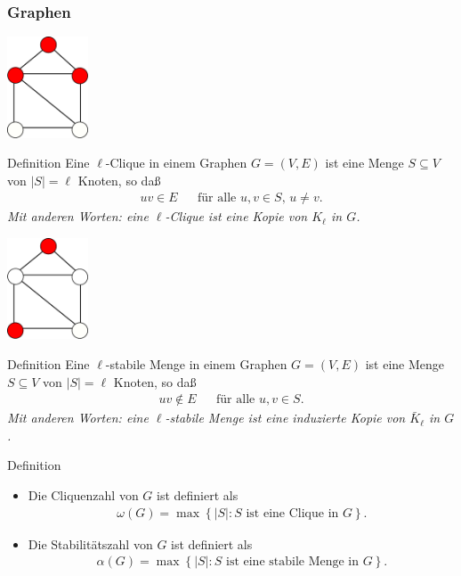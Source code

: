 \documentclass[aspectratio=1610, 11pt]{beamer}
\newcommand\cbc[1]{\left\{{#1}\right\}}
\newcommand{\mytitle}{Graphen}
\begin{document}
\begin{frame}\frametitle{\mytitle}
	\begin{overprint}
		\hfill\includegraphics[height=30mm]{images/house_clique.pdf}
	\begin{block}{Definition}
		Eine \alert{$\ell$-Clique} in einem Graphen $G=(V,E)$ ist eine Menge $S\subseteq V$ von $|S|=\ell$ Knoten, so da\ss
		\begin{align*}
			uv\in E&&\mbox{f\"ur alle }u,v\in S,\,u\neq v.
		\end{align*}
		\itshape Mit anderen Worten: eine $\ell$-Clique ist eine Kopie von $K_\ell$ in $G$.
	\end{block}
		\hfill\includegraphics[height=30mm]{images/house_ind.pdf}
	\begin{block}{Definition}
		Eine \alert{$\ell$-stabile Menge} in einem Graphen $G=(V,E)$ ist eine Menge $S\subseteq V$ von $|S|=\ell$  Knoten, so da\ss
		\begin{align*}
			uv\not\in E&&\mbox{f\"ur alle }u,v\in S.
		\end{align*}
		\itshape Mit anderen Worten: eine $\ell$-stabile Menge ist eine induzierte Kopie von $\bar K_\ell$ in $G$.
	\end{block}
	\begin{block}{Definition}
		\begin{itemize}
			\item Die \alert{Cliquenzahl} von $G$ ist definiert als
				\begin{align*}
					\omega(G)=\max\cbc{|S|:S\mbox{ ist eine Clique in }G}.
				\end{align*}
			\item Die \alert{Stabilit\"atszahl} von $G$ ist definiert als
				\begin{align*}
					\alpha(G)=\max\cbc{|S|:S\mbox{ ist eine stabile Menge in }G}.
				\end{align*}
		\end{itemize}
	\end{block}
	\end{overprint}
\end{frame}
\end{document}
